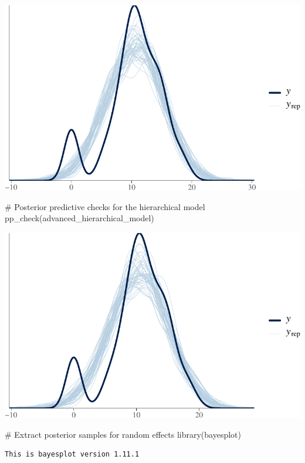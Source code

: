 \documentclass[
  10pt,
]{article}
\newenvironment{Shaded}{\begin{snugshade}}{\end{snugshade}}
\newcommand{\CommentTok}[1]{\textcolor[rgb]{0.37,0.37,0.37}{#1}}
\newcommand{\FunctionTok}[1]{\textcolor[rgb]{0.28,0.35,0.67}{#1}}
\newcommand{\NormalTok}[1]{\textcolor[rgb]{0.00,0.23,0.31}{#1}}
\begin{document}
\includegraphics{551-HW-Q3_files/figure-pdf/unnamed-chunk-15-1.pdf}

\begin{Shaded}
\begin{Highlighting}[]
\CommentTok{\# Posterior predictive checks for the hierarchical model}
\FunctionTok{pp\_check}\NormalTok{(advanced\_hierarchical\_model)}
\end{Highlighting}
\end{Shaded}

\includegraphics{551-HW-Q3_files/figure-pdf/unnamed-chunk-15-2.pdf}

\begin{Shaded}
\begin{Highlighting}[]
\CommentTok{\# Extract posterior samples for random effects}
\FunctionTok{library}\NormalTok{(bayesplot)}
\end{Highlighting}
\end{Shaded}

\begin{verbatim}
This is bayesplot version 1.11.1
\end{verbatim}
\end{document}
